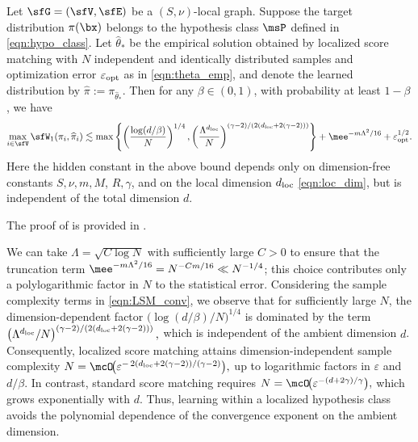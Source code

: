 \documentclass[11pt]{article}
\begin{document}
\begin{thm}
\label{thm:LSM}
Let $\sfG = (\sfV,\sfE)$ be a $(S,\nu)$-local graph. Suppose the target distribution $\pi(\bx)$ belongs to the hypothesis class $\msP$ defined in \eqref{eqn:hypo_class}.
%
Let $\widehat{\theta}_*$ be the empirical solution obtained by localized score matching with $N$ independent and identically distributed samples and optimization error $\varepsilon_{\rm opt}$ as in \eqref{eqn:theta_emp}, and denote the learned distribution by $\widehat{\pi} := \pi_{\widehat{\theta}_*}$.
%
Then for any $\beta\in (0,1)$, with probability at least $1-\beta$, we have 
\begin{equation}
\label{eqn:LSM_conv}
    \max_{i \in \sfV} \sfW_1(\pi_i,\widehat{\pi}_i) \lesssim \max \left\{ \left(\frac{\log(d/\beta)}{N}\right)^{1/4}, \left(\frac{\Lambda^{d_{\rm loc}}}{N}\right)^{(\gamma-2)/(2(d_{\rm loc} + 2(\gamma-2)))} \right\} + \mee^{-m\Lambda^2/16} + \varepsilon_{\rm opt}^{1/2}.
\end{equation}
Here the hidden constant in the above bound depends only on dimension-free constants $S,\nu,m,M$, $R,\gamma$, and on the local dimension $d_{\rm loc}$ \eqref{eqn:loc_dim}, but is independent of the total dimension $d$.
\end{thm}


The proof of  is provided in .
%
\begin{rem}
\label{rem:truncation}
We can take $\Lambda = \sqrt{ C \log N }$ with sufficiently large $C>0$ to ensure that the truncation term $\mee^{-m\Lambda^2/16} = N^{-Cm/16} \ll N^{-1/4}$; this choice contributes only a polylogarithmic factor in $N$ to the statistical error.
Considering the sample complexity terms in \eqref{eqn:LSM_conv}, we observe that for sufficiently large $N$, the dimension-dependent factor $\big(\log(d/\beta)/N\big)^{1/4}$ is dominated by the term
\(
\left(\Lambda^{d_{\rm loc}}/N\right)^{(\gamma-2)/(2(d_{\rm loc}+2(\gamma-2)))},
\)
which is independent of the ambient dimension $d$. Consequently, localized score matching attains dimension-independent sample complexity
\(
    N=\mcO \! \big( \varepsilon^{-\,2(d_{\rm loc}+2(\gamma-2))/(\gamma-2)} \big),
\)
up to logarithmic factors in $\varepsilon$ and $d/\beta$.
In contrast, standard score matching requires
\(
    N=\mcO\! \big( \varepsilon^{-(d+2\gamma)/\gamma} \big),
\)
which grows exponentially with $d$.
%
Thus, learning within a localized hypothesis class avoids the polynomial dependence of the convergence exponent on the ambient dimension.
\end{rem}
\end{document}
